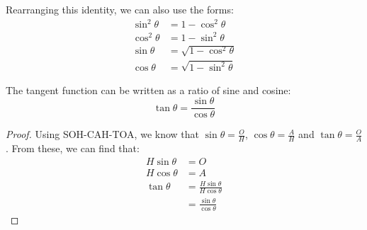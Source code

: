     Rearranging this identity, we can also use the forms:
    \begin{align*}
        \sin^2\theta&=1-\cos^2\theta \\
        \cos^2\theta&=1-\sin^2\theta \\
        \sin\theta&=\sqrt{1-\cos^2\theta} \\
        \cos\theta&=\sqrt{1-\sin^2\theta}
    \end{align*}

    \begin{theorem}
        The tangent function can be written as a ratio of sine and cosine:
        \begin{equation}
            \tan\theta=\frac{\sin\theta}{\cos\theta}
        \end{equation}
    \end{theorem}
    \begin{proof}
        Using SOH-CAH-TOA, we know that $\sin\theta=\frac{O}{H}$, $\cos\theta=\frac{A}{H}$ and $\tan\theta=\frac{O}{A}$.
        From these, we can find that:
        \begin{align*}
            H\sin\theta&=O \\
            H\cos\theta&=A \\
            \tan\theta&=\frac{H\sin\theta}{H\cos\theta} \\
            &=\frac{\sin\theta}{\cos\theta}
        \end{align*}
    \end{proof}

